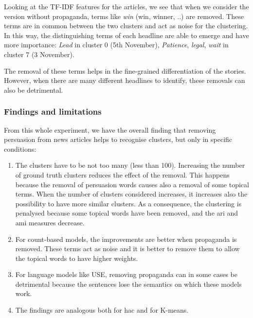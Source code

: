 Looking at the TF-IDF features for the articles, we see that when we consider the version without propaganda, terms like \emph{win} (win, winner, ..) are removed. These terms are in common between the two clusters and act as noise for the clustering.
In this way, the distinguishing terms of each headline are able to emerge and have more importance:
\emph{Lead} in cluster 0 (5th November), 
\emph{Patience}, \emph{legal}, \emph{wait} in cluster 7 (3 November).

The removal of these terms helps in the fine-grained differentiation of the stories.
However, when there are many different headlines to identify, these removals can also be detrimental.


\subsubsection{Findings and limitations} %
\label{ssec:lp_relationship_removing_findings}

From this whole experiment, we have the overall finding that removing persuasion from news articles helps to recognise clusters, but only in specific conditions:
\begin{enumerate}
    \item The clusters have to be not too many (less than 100).
    Increasing the number of ground truth clusters reduces the effect of the removal. This happens because the removal of persuasion words causes also a removal of some topical terms. When the number of clusters considered increases, it increases also the possibility to have more similar clusters. As a consequence, the clustering is penalysed because some topical words have been removed, and the \acrshort{ari} and \acrshort{ami} measures decrease.
    \item For count-based models, the improvements are better when propaganda is removed. These terms act as noise and it is better to remove them to allow the topical words to have higher weights.
    \item For language models like USE, removing propaganda can in some cases be detrimental because the sentences lose the semantics on which these models work.
    \item The findings are analogous both for \acrshort{hac} and for K-means.
\end{enumerate}

